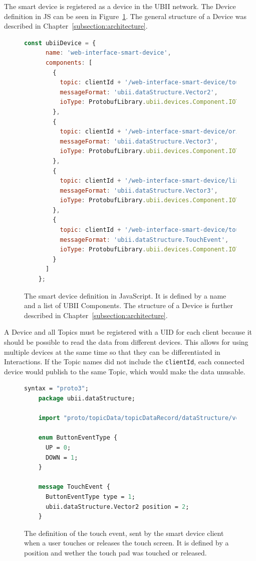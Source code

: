The smart device is registered as a device in the \ac{UBII} network. The Device definition in \ac{JS} can be seen in Figure~\ref{fig:ubii-device-registration}. The general structure of a Device was described in Chapter~\ref{subsection:architecture}. 

\begin{figure}[htpb]
  \begin{lstlisting}[language=JavaScript]
    const ubiiDevice = {
      name: 'web-interface-smart-device',
      components: [
        {
          topic: clientId + '/web-interface-smart-device/touch_position',
          messageFormat: 'ubii.dataStructure.Vector2',
          ioType: ProtobufLibrary.ubii.devices.Component.IOType.INPUT
        },
        {
          topic: clientId + '/web-interface-smart-device/orientation',
          messageFormat: 'ubii.dataStructure.Vector3',
          ioType: ProtobufLibrary.ubii.devices.Component.IOType.INPUT
        },
        {
          topic: clientId + '/web-interface-smart-device/linear_acceleration',
          messageFormat: 'ubii.dataStructure.Vector3',
          ioType: ProtobufLibrary.ubii.devices.Component.IOType.INPUT
        },
        {
          topic: clientId + '/web-interface-smart-device/touch_events',
          messageFormat: 'ubii.dataStructure.TouchEvent',
          ioType: ProtobufLibrary.ubii.devices.Component.IOType.INPUT
        }
      ]
    };
  \end{lstlisting}
  \caption[Protobuf definition of the smart device]{The smart device definition in JavaScript. It is defined by a name and a list of \ac{UBII} Components. The structure of a Device is further described in Chapter~\ref{subsection:architecture}.}\label{fig:ubii-device-registration}
\end{figure}

A Device and all Topics must be registered with a \ac{UID} for each client because it should be possible to read the data from different devices. This allows for using multiple devices at the same time so that they can be differentiated in Interactions. If the Topic names did not include the \lstinline{clientId}, each connected device would publish to the same Topic, which would make the data unusable.

\begin{figure}[H]
  \begin{lstlisting}[language=Protobuf]
    syntax = "proto3";
    package ubii.dataStructure;
    
    import "proto/topicData/topicDataRecord/dataStructure/vector2.proto";
    
    enum ButtonEventType {
      UP = 0;
      DOWN = 1;
    }

    message TouchEvent {
      ButtonEventType type = 1;
      ubii.dataStructure.Vector2 position = 2;
    }
  \end{lstlisting}
  \caption[Protobuf definition of the touch event]{The definition of the touch event, sent by the smart device client when a user touches or releases the touch screen. It is defined by a position and wether the touch pad was touched or released.}\label{fig:ubii-event-type}
\end{figure}

